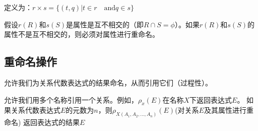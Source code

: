 定义为：$r\times s = \{(t,q)|t\in r\quad \text{and}q\in s \}$

假设$r(R)$和$s(S)$是属性是互不相交的（即$R\cap S=\phi$）。如果$r(R)$和$s(S)$的属性不是互不相交的，则必须对属性进行重命名。

\subsection{重命名操作}

允许我们为关系代数表达式的结果命名，从而引用它们（过程性）。

允许我们用多个名称引用一个关系。例如，$\rho_x(E)$在名称$X$下返回表达式$E$。
如果关系代数表达式$E$的元数为$n$，则$\rho_{X(A_1,A_2,...,A_n)}(E)$(对关系$E$及其属性进行重命名)
返回表达式的结果$E$
